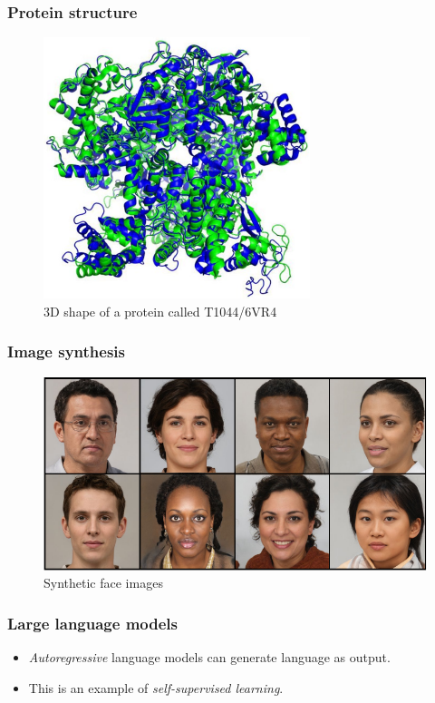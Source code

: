\documentclass{beamer}
\begin{document}
\begin{frame}
    \frametitle{Protein structure}
    \begin{figure}
        \caption{3D shape of a protein called T1044/6VR4}
        \includegraphics{Figure_2.pdf}
    \end{figure}
\end{frame}

\begin{frame}
    \frametitle{Image synthesis}
    \begin{figure}
        \caption{Synthetic face images}
        \includegraphics{Figure_3.pdf}
    \end{figure}
\end{frame}

\begin{frame}
    \frametitle{Large language models}
    \begin{itemize}
        \item \emph{Autoregressive} language models can generate language as output.
        \item This is an example of \emph{self-supervised learning}.
    \end{itemize}
\end{frame}
\end{document}
